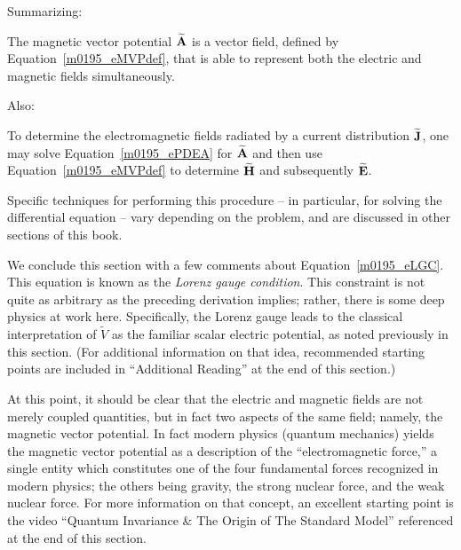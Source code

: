 Summarizing:
%
\begin{mdframed}[backgroundcolor=yellow!20,nobreak=true] 
The magnetic vector potential $\widetilde{\bf A}$ is a vector field, defined by Equation~\ref{m0195_eMVPdef}, that is able to represent both the electric and magnetic fields simultaneously.
\end{mdframed}
%
Also:
%
\begin{mdframed}[backgroundcolor=yellow!20,nobreak=true] 
To determine the electromagnetic fields radiated by a current distribution $\widetilde{\bf J}$, one may solve Equation~\ref{m0195_ePDEA} for $\widetilde{\bf A}$ and then use Equation~\ref{m0195_eMVPdef} to determine $\widetilde{\bf H}$ and subsequently $\widetilde{\bf E}$.
\end{mdframed}
%
Specific techniques for performing this procedure -- in particular, for solving the differential equation -- vary depending on the problem, and are discussed in other sections of this book.

We conclude this section with a few comments about Equation~\ref{m0195_eLGC}.
This equation is known as the \emph{Lorenz gauge condition}.
This constraint is not quite as arbitrary as the preceding derivation implies; rather, there is some deep physics at work here.
Specifically, the Lorenz gauge leads to the classical interpretation of $\widetilde{V}$ as the familiar scalar electric potential, as noted previously in this section. (For additional information on that idea, recommended starting points are included in ``Additional Reading'' at the end of this section.)

At this point, it should be clear that the electric and magnetic fields are not merely coupled quantities, but in fact two aspects of the same field; namely, the magnetic vector potential.
In fact modern physics (quantum mechanics) yields the magnetic vector potential as a description of the ``electromagnetic force,'' a single entity which constitutes one of the four fundamental forces recognized in modern physics; the others being gravity, the strong nuclear force, and the weak nuclear force. 
For more information on that concept, an excellent starting point is the video ``Quantum Invariance \& The Origin of The Standard Model'' referenced at the end of this section.

